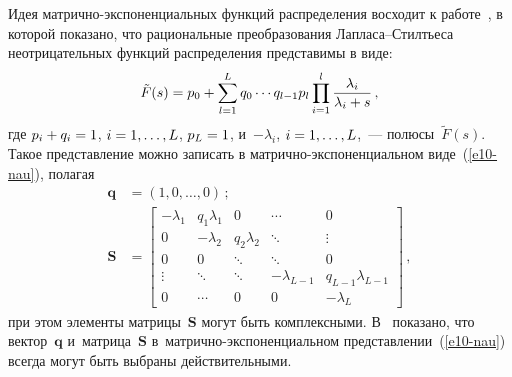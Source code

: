 \begin{multicols}{2}
  Идея матрично-экс\-по\-нен\-ци\-аль\-ных функций распределения восходит 
к работе~\cite{28-nau}, в которой показано, что рациональные преобразования  
Лап\-ла\-са--Стилть\-еса неотрицательных функций распределения 
представимы в виде:
  $$
  \tilde{F}(s)=p_0+\sum\limits^L_{l=1} q_0\cdots q_{l-1} p_l \prod\limits^l_{i=1} 
\displaystyle\frac{\displaystyle \lambda_i\mathstrut}{\displaystyle \lambda_{i}+s\mathstrut}\,,
  $$
где $p_i+q_i\hm=1$, $i\hm=1, \ldots , L$, $p_L\hm=1$, и~$-\lambda_i$, $i\hm=1, 
\ldots , L$,~--- полюсы~$\tilde{F}(s)$. Такое представление можно записать в 
мат\-рич\-но-экс\-по\-нен\-ци\-аль\-ном виде~(\ref{e10-nau}), полагая 
\begin{align*}
\mathbf{q}&=(1,0,\ldots ,0)\,;\\
\mathbf{S}&=\begin{bmatrix}
-\lambda_1&q_1\lambda_1&0&\cdots&0\\
0&-\lambda_2&q_2\lambda_2&\ddots &\vdots\\
0&0&\ddots& \ddots& 0\\
\vdots& \ddots& \ddots& -\lambda_{L-1}&q_{L-1}\lambda_{L-1}\\
0&\cdots & 0&0&-\lambda_L
\end{bmatrix}\,,
\end{align*}
%
  при этом элементы матрицы~$\mathbf{S}$ могут быть комплексными. 
В~\cite{22-nau} показано, что вектор~$\mathbf{q}$ и~мат\-ри\-ца~$\mathbf{S}$  
в~мат\-рич\-но-экс\-по\-нен\-ци\-аль\-ном  
пред\-ставлении~(\ref{e10-nau}) всегда могут быть выбраны действительными. 
  

\end{multicols}
